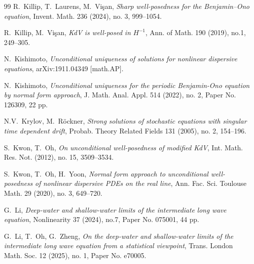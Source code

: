 \documentclass[letterpaper, 11pt,  reqno]{amsart}
\newcommand{\1}{\hspace{0.5mm}\text{I}\hspace{0.5mm}}
\numberwithin{equation}{section}
\numberwithin{theorem}{section}
\begin{document}
\begin{thebibliography}{99}
R.~Killip, T.~Laurens, M.~Vi\c{s}an, 
{\it Sharp well-posedness for the Benjamin--Ono equation}, 
Invent. Math. 236 (2024), no. 3, 999--1054.





R.~Killip, M.~Vi\c{s}an, 
{\it KdV is well-posed in $H^{-1}$}, 
Ann. of Math. 190 (2019), no.1, 249--305.



N.~Kishimoto,
{\it Unconditional uniqueness of solutions for nonlinear dispersive equations}, 
arXiv:1911.04349 [math.AP].


N.~Kishimoto,
{\it Unconditional uniqueness for the periodic Benjamin-Ono equation by normal form approach},
 J. Math. Anal. Appl. 514 (2022), no. 2, Paper No. 126309, 22 pp.


N.V.~Krylov, M.~R\"ockner,
    {\it Strong solutions of stochastic equations with singular time dependent drift},
    Probab. Theory Related Fields 131 (2005), no. 2, 154--196. 





S.~Kwon, T.~Oh, 
{\it  On unconditional well-posedness of modified KdV}, Int. Math. Res. Not. (2012), no. 15, 3509--3534. 






S.~Kwon, T.~Oh, H.~Yoon, 
{\it Normal form approach to unconditional well-posedness of nonlinear dispersive PDEs on the real line}, Ann. Fac. Sci. Toulouse Math. 29 (2020), no. 3, 649--720. 



G.~Li, 
{\it Deep-water and shallow-water limits of the intermediate long wave equation}, 
 Nonlinearity 37 (2024), no.7, Paper No. 075001, 44 pp. 
 
 
G.~Li, T.~Oh, G.~Zheng,
{\it On the deep-water and shallow-water limits of the intermediate long wave equation from a statistical viewpoint}, 
Trans. London Math. Soc. 
 12 (2025), no. 1, Paper No. e70005. 






%
%
%


%
%
%
%




\end{thebibliography}
\end{document}
